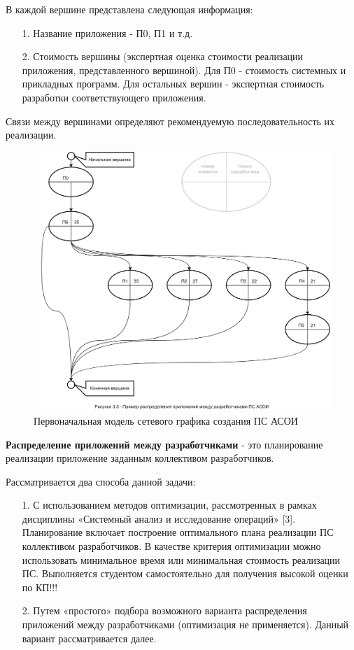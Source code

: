 \documentclass[12pt, a4paper, simple]{eskdtext}
\begin{document}
    В каждой вершине представлена следующая информация:
    \begin{enumerate}
        \item[1.] Название приложения - П0, П1 и т.д.
        \item[2.] Стоимость вершины (экспертная оценка стоимости реализации приложения, представленного вершиной).
        Для П0 - стоимость системных и прикладных программ.
        Для остальных вершин - экспертная стоимость разработки соответствующего приложения.
    \end{enumerate}

    Связи между вершинами определяют рекомендуемую последовательность их реализации.

    \begin{figure}[ph!]
        \centering
        \includegraphics[width=16cm]
            {_docs/Рисунок3-3ПримерРаспределенияПриложенияМеждуРазработчикамиПСАСОИ.png}
        \caption{Первоначальная модель сетевого графика создания ПС АСОИ}
    \end{figure}

    \newpage
    \textbf{Распределение приложений между разработчиками} - это планирование реализации приложение заданным коллективом разработчиков. 
    
    Рассматривается два способа данной задачи:
    \begin{enumerate}
        \item[1.] С использованием методов оптимизации, рассмотренных в рамках дисциплины «Системный анализ и исследование операций» [3].
        Планирование включает построение оптимального плана реализации ПС коллективом разработчиков.
        В качестве критерия оптимизации можно использовать минимальное время или минимальная стоимость реализации ПС.
        Выполняется студентом самостоятельно для получения высокой оценки по КП!!!
        \item[2.] Путем «простого» подбора возможного варианта распределения приложений между разработчиками (оптимизация не применяется).
        Данный вариант рассматривается далее.
    \end{enumerate}
\end{document}
